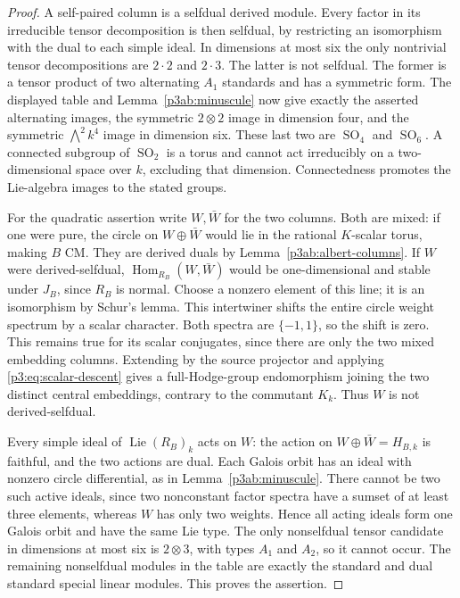 \documentclass[11pt]{article}
\numberwithin{equation}{section}
\begin{document}
\begin{proof}
A self-paired column is a selfdual derived module.  Every factor in
its irreducible tensor decomposition is then selfdual, by restricting
an isomorphism with the dual to each simple ideal.  In dimensions at
most six the only nontrivial tensor decompositions are \(2\cdot2\)
and \(2\cdot3\).  The latter is not selfdual.  The former is a
tensor product of two alternating \(A_1\) standards and has a
symmetric form.  The displayed table and
Lemma~\ref{p3ab:minuscule} now give exactly the asserted alternating
images, the symmetric \(2\otimes2\) image in dimension four, and
the symmetric \(\bigwedge^2k^4\) image in dimension six.  These
last two are \(\operatorname{SO}_4\) and
\(\operatorname{SO}_6\).  A connected subgroup of
\(\operatorname{SO}_2\) is a torus and cannot act irreducibly on
a two-dimensional space over \(k\), excluding that dimension.
Connectedness promotes the Lie-algebra images to the stated groups.

For the quadratic assertion write \(W,\bar W\) for the two
columns.  Both are mixed: if one were pure, the circle on
\(W\oplus\bar W\) would lie in the rational \(K\)-scalar torus,
making \(B\) CM.  They are derived duals by
Lemma~\ref{p3ab:albert-columns}.  If \(W\) were derived-selfdual,
\(\operatorname{Hom}_{R_B}(W,\bar W)\) would be one-dimensional and
stable under \(J_B\), since \(R_B\) is normal.  Choose a nonzero
element of this line; it is an isomorphism by Schur's lemma.  This
intertwiner shifts the entire circle
weight spectrum by a scalar character.  Both spectra are
\(\{-1,1\}\), so the shift is zero.  This remains true for its
scalar conjugates, since there are only the two mixed embedding
columns.  Extending by the source projector and applying
\eqref{p3:eq:scalar-descent} gives a full-Hodge-group
endomorphism joining the two distinct central embeddings, contrary
to the commutant \(K_k\).  Thus \(W\) is not derived-selfdual.

Every simple ideal of \(\operatorname{Lie}(R_B)_k\) acts on \(W\):
the action on \(W\oplus\bar W=H_{B,k}\) is faithful, and the two
actions are dual.  Each Galois orbit has an ideal with nonzero
circle differential, as in Lemma~\ref{p3ab:minuscule}.  There
cannot be two such active ideals, since two nonconstant factor
spectra have a sumset of at least three elements, whereas \(W\)
has only two weights.  Hence all acting ideals form one Galois
orbit and have the same Lie type.  The only nonselfdual tensor
candidate in dimensions at most six is \(2\otimes3\), with types
\(A_1\) and \(A_2\), so it cannot occur.  The remaining
nonselfdual modules in the table are exactly the standard and dual
standard special linear modules.  This proves the assertion.
\end{proof}
\end{document}
